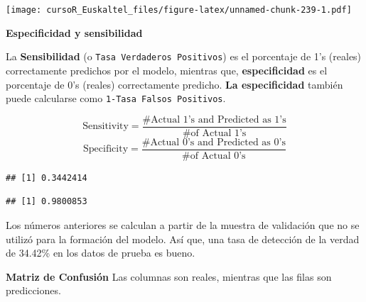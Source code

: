 \documentclass[]{book}
\newenvironment{Shaded}{\begin{snugshade}}{\end{snugshade}}
\newcommand{\KeywordTok}[1]{\textcolor[rgb]{0.13,0.29,0.53}{\textbf{#1}}}
\newcommand{\DataTypeTok}[1]{\textcolor[rgb]{0.13,0.29,0.53}{#1}}
\newcommand{\OperatorTok}[1]{\textcolor[rgb]{0.81,0.36,0.00}{\textbf{#1}}}
\newcommand{\NormalTok}[1]{#1}
\begin{document}
\texttt{[image: cursoR\_Euskaltel\_files/figure-latex/unnamed-chunk-239-1.pdf]}

\textbf{Especificidad y sensibilidad}

La \textbf{Sensibilidad} (o \texttt{Tasa\ Verdaderos\ Positivos}) es el
porcentaje de 1's (reales) correctamente predichos por el modelo,
mientras que, \textbf{especificidad} es el porcentaje de 0's (reales)
correctamente predicho. \textbf{La especificidad} también puede
calcularse como \texttt{1-Tasa\ Falsos\ Positivos}.

\[
\text{Sensitivity}=\frac{\#\text{Actual 1's and Predicted as 1's}}{\# \text{of Actual 1's}}
\] \[
\text{Specificity}=\frac{\#\text{Actual 0's and Predicted as 0's}}{\# \text{of Actual 0's}}
\]

\begin{Shaded}
\end{Shaded}

\begin{verbatim}
## [1] 0.3442414
\end{verbatim}

\begin{Shaded}
\end{Shaded}

\begin{verbatim}
## [1] 0.9800853
\end{verbatim}

Los números anteriores se calculan a partir de la muestra de validación
que no se utilizó para la formación del modelo. Así que, una tasa de
detección de la verdad de 34.42\% en los datos de prueba es bueno.

\textbf{Matriz de Confusión} Las columnas son reales, mientras que las
filas son predicciones.

\begin{Shaded}
\end{Shaded}
\end{document}
